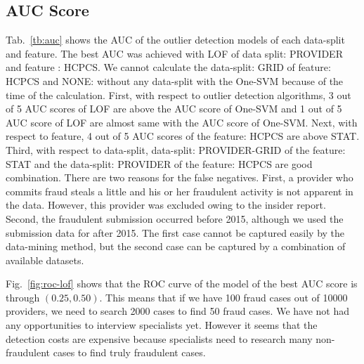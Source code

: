 \documentclass[dvipdfmx, english]{ampmt}             %
\newcommand{\Tabref}[1]{Tab.~\ref{#1}}
\newcommand{\Figref}[1]{Fig.~\ref{#1}}
\newcommand{\Appref}[1]{Appendix ~\ref{#1}}
\begin{document}
\subsection{AUC Score}

\Tabref{tb:auc} shows the AUC of the outlier detection models of each data-split and feature. The best AUC was achieved with LOF of data split: PROVIDER and feature : HCPCS.
We cannot calculate the data-split: GRID of feature: HCPCS and NONE: without any data-split with the One-SVM because of the time of the calculation.
First, with respect to outlier detection algorithms, 3 out of 5 AUC scores of LOF are above the AUC score of One-SVM and 1 out of 5 AUC score of LOF are almost same with the AUC score of One-SVM.
Next, with respect to feature, 4 out of 5 AUC scores of the feature: HCPCS are above STAT.  Third, with respect to data-split, data-split: PROVIDER-GRID of the feature: STAT and the data-split: PROVIDER of the feature: HCPCS are 
good combination.
There are two reasons for the false negatives. First, a provider who commits fraud steals a little and his or her fraudulent activity is not apparent in the data. However, this provider was excluded 
owing to the insider report. Second, the fraudulent submission occurred before 2015, although we used the submission data for after 2015. The first case cannot be captured easily by the data-mining method, 
but the second case can be captured by a combination of available datasets. \par
\Figref{fig:roc-lof} shows that the ROC curve of the model of the best AUC score is through $(0.25, 0.50)$. This means that if we have 100 fraud cases out of 10000 providers, we need to search 2000 cases to find 50 fraud cases.
We have not had any opportunities to interview specialists yet. However it seems that the detection costs are expensive because specialists need to research many non-fraudulent cases to find truly fraudulent cases.
\par
\end{document}
